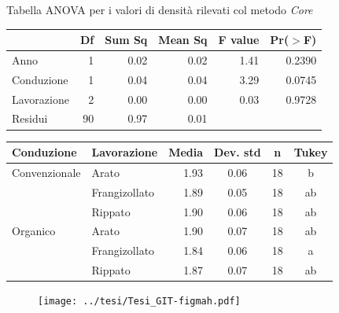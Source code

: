 \documentclass[10pt]{beamer}
\begin{document}
\begin{frame}{Tabella ANOVA per i valori di densità rilevati col metodo \emph{Core}} 
  \begin{table}[ht]
    \centering
    \label{tab:anova del modello}
    \begin{tabular}{lrrrrr}
      \hline
      & Df & Sum Sq & Mean Sq & F value & Pr($>$F) \\ 
      \hline
      Anno & 1 & 0.02 & 0.02 & 1.41 & 0.2390 \\ 
      Conduzione & 1 & 0.04 & 0.04 & 3.29 & 0.0745 \\ 
      Lavorazione & 2 & 0.00 & 0.00 & 0.03 & 0.9728 \\ 
      Residui & 90 & 0.97 & 0.01 &  &  \\ 
      \hline
    \end{tabular}
  \end{table}
\end{frame}


\begin{frame}[label=Clod]
  \hyperlink{densita}{}
  \footnotesize
  \begin{table}[ht]
    \centering
    \begin{tabular}{llrccc}
      \hline
      Conduzione & Lavorazione & Media & Dev. std & n & Tukey \\ 
      \hline
      Convenzionale & Arato & 1.93 & 0.06 &  18 & b \\ 
                 & Frangizollato & 1.89 & 0.05 &  18 & ab \\ 
                 & Rippato & 1.90 & 0.06 &  18 & ab \\ 
      Organico & Arato & 1.90 & 0.07 &  18 & ab \\ 
                 & Frangizollato & 1.84 & 0.06 &  18 & a \\ 
                 & Rippato & 1.87 & 0.07 &  18 & ab \\ 
      \hline
    \end{tabular}
    \label{tab:RiassuntoDensitaSpinta}
  \end{table}
\end{frame}

\begin{frame}
  \vspace{1.5cm}
  \begin{figure}
    \texttt{[image: ../tesi/Tesi\_GIT-figmah.pdf]}
  \end{figure}
\end{frame}
\end{document}
